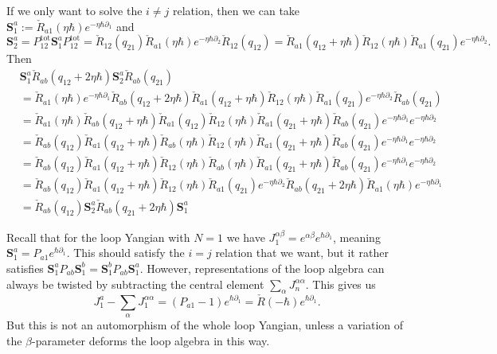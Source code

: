 \documentclass[11pt]{report}
\theoremstyle{definition}
\theoremstyle{remark}
\theoremstyle{remark}
\begin{document}
If we only want to solve the $i \neq j$ relation, then we can take $\mathbf{S}_1^a := \check R_{a1}(\eta\hbar) e^{-\eta\hbar\partial_1}$ and
\begin{equation*}
\mathbf{S}_2^a = P_{12}^\text{tot} \mathbf{S}_1^a P_{12}^\text{tot} = \check R_{12}(q_{21}) \check R_{a1}(\eta\hbar) e^{-\eta\hbar\partial_2} \check R_{12}(q_{12}) = \check R_{a1}(q_{12}+\eta\hbar) \check R_{12}(\eta\hbar) \check R_{a1}(q_{21}) e^{-\eta\hbar\partial_2}.
\end{equation*}
Then
\begin{align*}
&\mathbf{S}_1^a \check R_{ab}(q_{12}+2\eta\hbar) \mathbf{S}_2^a \check R_{ab}(q_{21}) \\
&= \check R_{a1}(\eta\hbar) e^{-\eta\hbar\partial_1} \check R_{ab}(q_{12}+2\eta\hbar) \check R_{a1}(q_{12}+\eta\hbar) \check R_{12}(\eta\hbar) \check R_{a1}(q_{21}) e^{-\eta\hbar\partial_2} \check R_{ab}(q_{21}) \\
&= \check R_{a1}(\eta\hbar) \check R_{ab}(q_{12}+\eta\hbar) \check R_{a1}(q_{12}) \check R_{12}(\eta\hbar) \check R_{a1}(q_{21}+\eta\hbar) \check R_{ab}(q_{21}) e^{-\eta\hbar\partial_1} e^{-\eta\hbar\partial_2} \\
&= \check R_{ab}(q_{12}) \check R_{a1}(q_{12}+\eta\hbar) \check R_{ab}(\eta\hbar) \check R_{12}(\eta\hbar) \check R_{a1}(q_{21}+\eta\hbar) \check R_{ab}(q_{21}) e^{-\eta\hbar\partial_1} e^{-\eta\hbar\partial_2} \\
&= \check R_{ab}(q_{12}) \check R_{a1}(q_{12}+\eta\hbar) \check R_{12}(\eta\hbar) \check R_{ab}(\eta\hbar) \check R_{a1}(q_{21}+\eta\hbar) \check R_{ab}(q_{21}) e^{-\eta\hbar\partial_1} e^{-\eta\hbar\partial_2} \\
&= \check R_{ab}(q_{12}) \check R_{a1}(q_{12}+\eta\hbar) \check R_{12}(\eta\hbar) \check R_{a1}(q_{21}) e^{-\eta\hbar\partial_2} \check R_{ab}(q_{21}+2\eta\hbar) \check R_{a1}(\eta\hbar) e^{-\eta\hbar\partial_1} \\
&= \check R_{ab}(q_{12}) \mathbf{S}_2^a \check R_{ab}(q_{21}+2\eta\hbar) \mathbf{S}_1^a
\end{align*}

Recall that for the loop Yangian with $N=1$ we have $J_1^{\alpha\beta} = e^{\alpha\beta} e^{\hbar\partial_1}$, meaning $\mathbf{S}_1^a = P_{a1} e^{\hbar\partial_1}$. This should satisfy the $i=j$ relation that we want, but it rather satisfies $\mathbf{S}_1^a P_{ab} \mathbf{S}_1^b = \mathbf{S}_1^b P_{ab} \mathbf{S}_1^a$. However, representations of the loop algebra can always be twisted by subtracting the central element $\sum_\alpha J_n^{\alpha\alpha}$. This gives us
\begin{equation*}
J_1^a - \sum_\alpha J_1^{\alpha\alpha} = (P_{a1}-1) e^{\hbar\partial_1} = \check R(-\hbar) e^{\hbar\partial_1}.
\end{equation*}
But this is not an automorphism of the whole loop Yangian, unless a variation of the $\beta$-parameter deforms the loop algebra in this way.
\end{document}
